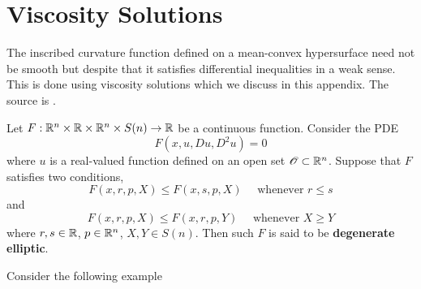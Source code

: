 \chapter{Viscosity Solutions}

The inscribed curvature function defined on a mean-convex hypersurface need not be smooth but despite that it satisfies differential inequalities in a weak sense. This is done using viscosity solutions which we discuss in this appendix. The source is \cite{crandall1992user}. 

\begin{defn}
    Let $ F : \mathbb{R}^{n} \times \mathbb{R} \times \mathbb{R}^{n} \times S(n) \to \mathbb{R}$ be a continuous function. Consider the PDE \begin{equation}
        F(x,u,Du, D^{2}u) = 0
    \end{equation}
    where $ u $ is a real-valued function defined on an open set $ \mathscr{O} \subset \mathbb{R}^{n} $. Suppose that $ F $ satisfies two conditions, \begin{equation}
        F(x,r,p,X) \le F(x,s,p,X) \quad \text{ whenever } r\le s 
    \end{equation}
    and \begin{equation}
        F(x,r,p,X) \le F(x,r,p,Y) \quad \text{ whenever } X \ge Y 
    \end{equation}
    where $ r,s \in \mathbb{R} $, $ p \in \mathbb{R}^{n} $, $ X,Y \in S(n) $.
    Then such $ F $ is said to be \textbf{degenerate elliptic}. 
\end{defn}

Consider the following example

